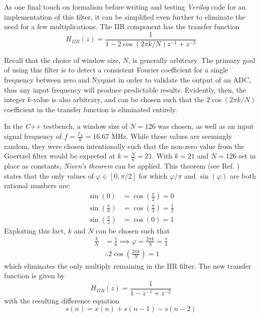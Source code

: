 \documentclass[reprint,amsmath,amssymb]{revtex4-2}
\begin{document}
As one final touch on formalism before writing and testing \textit{Verilog} code for an implementation of this filter, it can be simplified even further to eliminate the need for a few multiplications. The IIR component has the transfer function
\begin{equation}
    H_{IIR}(z) = \frac{1}{1-2\cos(2\pi k/N)z^{-1} + z^{-2}}
\end{equation}

Recall that the choice of window size, $N$, is generally arbitrary. The primary goal of using this filter is to detect a consistent Fourier coefficient for a single frequency between zero and Nyquist in order to validate the output of an ADC, thus any input frequency will produce predictable results. Evidently, then, the integer $k$-value is also arbitrary, and can be chosen such that the $2\cos(2\pi k/N)$ coefficient in the transfer function is eliminated entirely.

In the \textit{C++} testbench, a window size of $N = 126$ was chosen, as well as an input signal frequency of $f = \frac{f_N}{6} = 16.67$ MHz. While these values are seemingly random, they were chosen intentionally such that the non-zero value from the Goertzel filter would be expected at $k = \frac{N}{6} = 21$. With $k = 21$ and $N = 126$ set in place as constants, \textit{Niven's theorem} can be applied. This theorem (see Ref. \cite{niven}) states that the only values of $\varphi \in [0,\pi/2]$ for which $\varphi/\pi$ and  $\sin(\varphi)$ are both rational numbers are:
\begin{align}
    \sin(0) & = \cos(\frac{\pi}{2}) = 0 \nonumber \\
    \sin(\frac{\pi}{6}) & = \cos(\frac{\pi}{3}) = \frac{1}{2} \\
    \sin(\frac{\pi}{2}) & = \cos(0) = 1 \nonumber
\end{align}
Exploiting this fact, $k$ and $N$ can be chosen such that
\begin{align}
    \frac{k}{N} & = \frac{1}{6}  \implies \varphi = \frac{2\pi k}{N} = \frac{\pi}{3} \nonumber \\ 
    & \therefore 2\cos(\frac{2\pi k}{N}) = 1
\end{align}
which eliminates the only multiply remaining in the IIR filter. The new transfer function is given by
\begin{equation}
    H_{IIR}(z) = \frac{1}{1 - z^{-1} + z^{-2}}
\end{equation}
with the resulting difference equation
\begin{equation}
    s(n) = x(n) + s(n-1) - s(n-2)
\end{equation}
\end{document}
